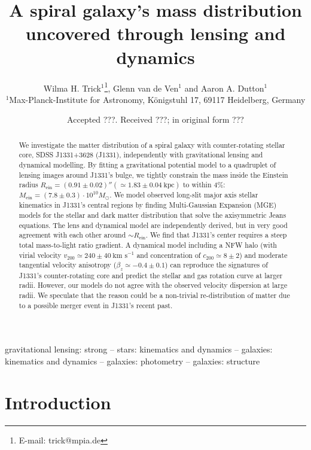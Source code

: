 \documentclass[useAMS,usenatbib]{mnras}
\title[A spiral galaxy's mass distribution uncovered]{A spiral galaxy's mass distribution uncovered through lensing and dynamics}
\author[W.H. Trick, G. van de Ven and A.A. Dutton]{Wilma H. Trick$^{1}$\thanks{E-mail:
trick@mpia.de}, Glenn van de Ven$^{1}$ and Aaron A. Dutton$^{1}$\\
$^{1}$Max-Planck-Institute for Astronomy, K\"{o}nigstuhl 17, 69117 Heidelberg, Germany}
\begin{document}
\date{Accepted ???. Received ???; in original form ???}

\pagerange{\pageref{firstpage}--\pageref{lastpage}} 

\maketitle

\label{firstpage}

\begin{abstract}
We investigate the matter distribution of a spiral galaxy with counter-rotating stellar core, SDSS J1331+3628 (J1331), independently with gravitational lensing and dynamical modelling. By fitting a gravitational potential model to a quadruplet of lensing images around J1331's bulge, we tightly constrain the mass inside the Einstein radius $R_\text{ein}=(0.91\pm0.02)''(\simeq1.83\pm0.04~\text{kpc})$ to within 4\%: $M_\text{ein} = (7.8\pm0.3) \cdot 10^{10} M_\odot$. We model observed long-slit major axis stellar kinematics in J1331's central regions by finding Multi-Gaussian Expansion (MGE) models for the stellar and dark matter distribution that solve the axisymmetric Jeans equations. The lens and dynamical model are independently derived, but in very good agreement with each other around $\sim R_\text{ein}$. We find that J1331's center requires a steep total mass-to-light ratio gradient. A dynamical model including a NFW halo (with virial velocity $v_{200} \simeq 240 \pm 40~\text{km s}^{-1}$ and concentration of $c_{200} \simeq 8 \pm 2$) and moderate tangential velocity anisotropy ($\beta_z \simeq -0.4 \pm 0.1$) can reproduce the signatures of J1331's counter-rotating core and predict the stellar and gas rotation curve at larger radii. However, our models do not agree with the observed velocity dispersion at large radii. We speculate that the reason could be a non-trivial re-distribution of matter due to a possible merger event in J1331's recent past.
\end{abstract}

\begin{keywords}
gravitational lensing: strong -- stars: kinematics and dynamics -- galaxies: kinematics and dynamics -- galaxies: photometry -- galaxies: structure
\end{keywords}

\section{Introduction}
\end{document}
